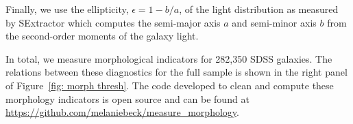 \documentclass[twocolumn]{aastex6}
\newcommand\aastex{AAS\TeX}
\begin{document}
Finally, we use the ellipticity, $\epsilon = 1 - b/a$, of the light distribution as measured by SExtractor which computes the semi-major axis $a$ and semi-minor axis $b$ from the second-order moments of the galaxy light.  

In total, we measure morphological indicators for 282,350 SDSS galaxies. The relations between these diagnostics for the full sample is shown in the right panel of Figure~\ref{fig: morph thresh}. The code developed to clean and compute these morphology indicators is open source and can be found at \url{https://github.com/melaniebeck/measure_morphology}.













\listofchanges
\end{document}
